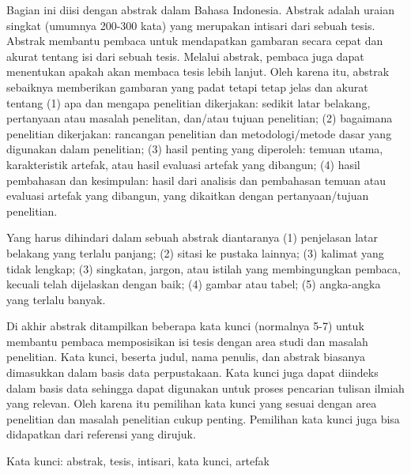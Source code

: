 \newpage
{}
\vspace{10mm}
\normalsize
\justifying



\indent
Bagian ini diisi dengan abstrak dalam Bahasa Indonesia. Abstrak adalah uraian singkat (umumnya 200-300 kata) yang merupakan intisari dari sebuah tesis. Abstrak membantu pembaca untuk mendapatkan gambaran secara cepat dan akurat tentang isi dari sebuah tesis. Melalui abstrak, pembaca juga dapat menentukan apakah akan membaca tesis lebih lanjut. Oleh karena itu, abstrak sebaiknya memberikan gambaran yang padat tetapi tetap jelas dan akurat tentang (1) apa dan mengapa penelitian dikerjakan: sedikit latar belakang, pertanyaan atau masalah penelitan, dan/atau tujuan penelitian; (2) bagaimana penelitian dikerjakan: rancangan penelitian dan metodologi/metode dasar yang digunakan dalam penelitian; (3) hasil penting yang diperoleh: temuan utama, karakteristik artefak, atau hasil evaluasi artefak yang dibangun; (4) hasil pembahasan dan kesimpulan: hasil dari analisis dan pembahasan temuan atau evaluasi artefak yang dibangun, yang dikaitkan dengan pertanyaan/tujuan penelitian.

Yang harus dihindari dalam sebuah abstrak diantaranya (1) penjelasan latar belakang yang terlalu panjang; (2) sitasi ke pustaka lainnya; (3) kalimat yang tidak lengkap; (3) singkatan, jargon, atau istilah yang membingungkan pembaca, kecuali telah dijelaskan dengan baik; (4) gambar atau tabel; (5) angka-angka yang terlalu banyak.

Di akhir abstrak ditampilkan beberapa kata kunci (normalnya 5-7) untuk membantu pembaca memposisikan isi tesis dengan area studi dan masalah penelitian. Kata kunci, beserta judul, nama penulis, dan abstrak biasanya dimasukkan dalam basis data perpustakaan. Kata kunci juga dapat diindeks dalam basis data sehingga dapat digunakan untuk proses pencarian tulisan ilmiah yang relevan. Oleh karena itu pemilihan kata kunci yang sesuai dengan area penelitian dan masalah penelitian cukup penting. Pemilihan kata kunci juga bisa didapatkan dari referensi yang dirujuk. 

\vspace{5mm}
\noindent
Kata kunci: abstrak, tesis, intisari, kata kunci, artefak
